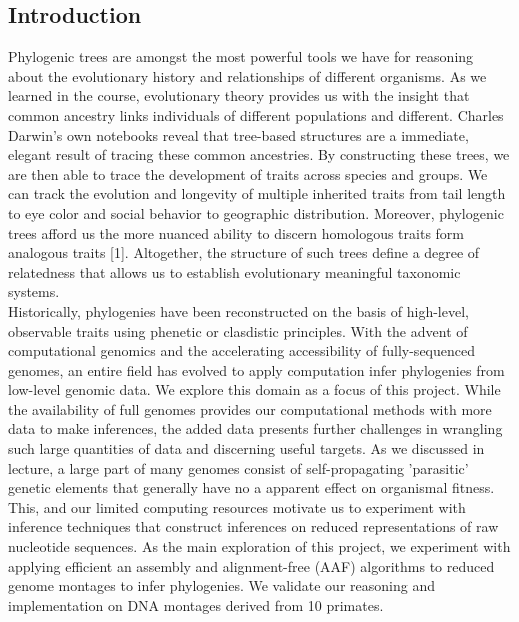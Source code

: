 \documentclass[a4paper]{article}
\begin{document}
\begin{multicols}{2}
\section{Introduction}
Phylogenic trees are amongst the most powerful tools we have for reasoning about the evolutionary history and relationships of different organisms. As we learned in the course, evolutionary theory provides us with the insight that common ancestry links individuals of different populations and different. Charles Darwin's own notebooks reveal that tree-based structures are a immediate, elegant result of tracing these common ancestries. By constructing these trees, we are then able to trace the development of traits across species and groups. We can track the evolution and longevity of multiple inherited traits from tail length to eye color and social behavior to geographic distribution. Moreover, phylogenic trees afford us the more nuanced ability to discern homologous traits form analogous traits [1]. Altogether, the structure of such trees define a degree of relatedness that allows us to establish evolutionary meaningful taxonomic systems.\\

Historically, phylogenies have been reconstructed on the basis of high-level, observable traits using phenetic or clasdistic principles. With the advent of computational genomics and the accelerating accessibility of fully-sequenced genomes, an entire field has evolved to apply computation infer phylogenies from low-level genomic data. We explore this domain as a focus of this project. While the availability of full genomes provides our computational methods with more data to make inferences, the added data presents further challenges in wrangling such large quantities of data and discerning useful targets. As we discussed in lecture, a large part of many genomes consist of self-propagating 'parasitic' genetic elements that generally have no a apparent effect on organismal fitness. This, and our limited computing resources motivate us to experiment with inference techniques that construct inferences on reduced representations of raw nucleotide sequences. As the main exploration of this project, we experiment with applying efficient an assembly and alignment-free (AAF) algorithms to reduced genome montages to infer phylogenies. We validate our reasoning and implementation on DNA montages derived from 10 primates.


\end{multicols}
\end{document}
